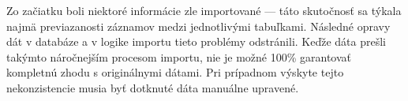  Zo začiatku boli niektoré informácie zle importované --- táto skutočnosť sa týkala najmä previazanosti záznamov medzi jednotlivými tabuľkami. Následné opravy dát v databáze a v logike importu tieto problémy odstránili. Keďže dáta prešli takýmto náročnejším procesom importu, nie je možné 100\% garantovať kompletnú zhodu s originálnymi dátami. Pri prípadnom výskyte tejto nekonzistencie musia byť dotknuté dáta manuálne upravené.

